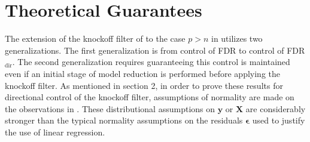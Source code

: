 \documentclass[]{scrartcl}
\newcommand{\1}[1]{\mathbbm{1}_{\left\{#1\right\}}}
\begin{document}
\section{Theoretical Guarantees}
The extension of the knockoff filter of \cite{ko} to the case $p > n$ in \cite{kohd} utilizes two generalizations. The first generalization is from control of FDR to control of FDR$_{\text{dir}}$. The second generalization requires guaranteeing this control is maintained even if an initial stage of model reduction is performed before applying the knockoff filter. As mentioned in section 2, in order to prove these results for directional control of the knockoff filter, assumptions of normality are made on the observations in \cite{kohd}.  These distributional assumptions on $\mathbf{y}$ or $\mathbf{X}$ are considerably stronger than the typical normality assumptions on the residuals $\pmb{\epsilon}$ used to justify the use of linear regression.  
\end{document}
